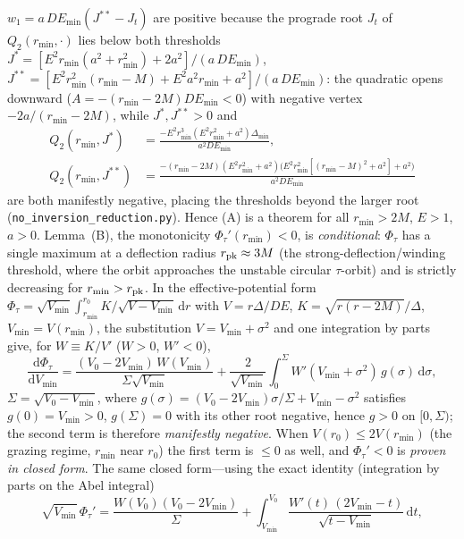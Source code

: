 \documentclass[12pt]{iopart}
\theoremstyle{plain}
\theoremstyle{definition}
\theoremstyle{remark}
\newcommand{\dd}{\mathrm{d}}
\begin{document}
$w_1=a\,DE_{\min}(J^{\ast\ast}-J_t)$ are positive because the prograde root $J_t$ of
$Q_2(r_{\min},\cdot)$ lies below both thresholds
$J^\ast=[E^2r_{\min}(a^2+r_{\min}^2)+2a^2]/(a\,DE_{\min})$,
$J^{\ast\ast}=[E^2r_{\min}^2(r_{\min}-M)+E^2a^2r_{\min}+a^2]/(a\,DE_{\min})$: the
quadratic opens downward ($A=-(r_{\min}-2M)DE_{\min}<0$) with negative vertex
$-2a/(r_{\min}-2M)$, while $J^\ast,J^{\ast\ast}>0$ and
\[
\begin{aligned}
Q_2(r_{\min},J^\ast)&=\frac{-E^2r_{\min}^3(E^2r_{\min}^2+a^2)\Delta_{\min}}{a^2DE_{\min}},\\[2pt]
Q_2(r_{\min},J^{\ast\ast})&=\frac{-(r_{\min}-2M)(E^2r_{\min}^2+a^2)\big(E^2r_{\min}^2[(r_{\min}-M)^2+a^2]+a^2\big)}{a^2DE_{\min}}
\end{aligned}
\]
are both manifestly negative, placing the thresholds beyond the larger root
(\texttt{no\_inversion\_reduction.py}). Hence (A) is a theorem for all $r_{\min}>2M$,
$E>1$, $a>0$. Lemma~(B), the monotonicity $\Phi_\tau'(r_{\min})<0$, is
\emph{conditional}: $\Phi_\tau$ has a single maximum at a deflection radius
$r_{\rm pk}\approx3M$ (the strong-deflection/winding threshold, where the orbit
approaches the unstable circular $\tau$-orbit) and is strictly decreasing for
$r_{\min}>r_{\rm pk}$. In the effective-potential form
$\Phi_\tau=\sqrt{V_{\min}}\int_{r_{\min}}^{r_0}K/\sqrt{V-V_{\min}}\,\dd r$ with
$V=r\Delta/DE$, $K=\sqrt{r(r-2M)}/\Delta$, $V_{\min}=V(r_{\min})$, the substitution
$V=V_{\min}+\sigma^2$ and one integration by parts give, for $W\equiv K/V'$
($W>0$, $W'<0$),
\begin{equation}
    \frac{\dd\Phi_\tau}{\dd V_{\min}}=
    \frac{(V_0-2V_{\min})\,W(V_{\min})}{\Sigma\sqrt{V_{\min}}}
    +\frac{2}{\sqrt{V_{\min}}}\!\int_0^{\Sigma}\!W'(V_{\min}+\sigma^2)\,g(\sigma)\,\dd\sigma,
\end{equation}
$\Sigma=\sqrt{V_0-V_{\min}}$, where $g(\sigma)=(V_0-2V_{\min})\sigma/\Sigma+V_{\min}-\sigma^2$
satisfies $g(0)=V_{\min}>0$, $g(\Sigma)=0$ with its other root negative, hence
$g>0$ on $[0,\Sigma)$; the second term is therefore \emph{manifestly negative}.
When $V(r_0)\le2V(r_{\min})$ (the grazing regime, $r_{\min}$ near $r_0$) the first
term is $\le0$ as well, and $\Phi_\tau'<0$ is \emph{proven in closed form}. The same
closed form---using the exact identity (integration by parts on the Abel integral)
\begin{equation}
    \sqrt{V_{\min}}\,\Phi_\tau'=\frac{W(V_0)(V_0-2V_{\min})}{\Sigma}
    +\int_{V_{\min}}^{V_0}\!\frac{W'(t)\,(2V_{\min}-t)}{\sqrt{t-V_{\min}}}\,\dd t ,
    \label{eq:phitau-closed}
\end{equation}
\end{document}
